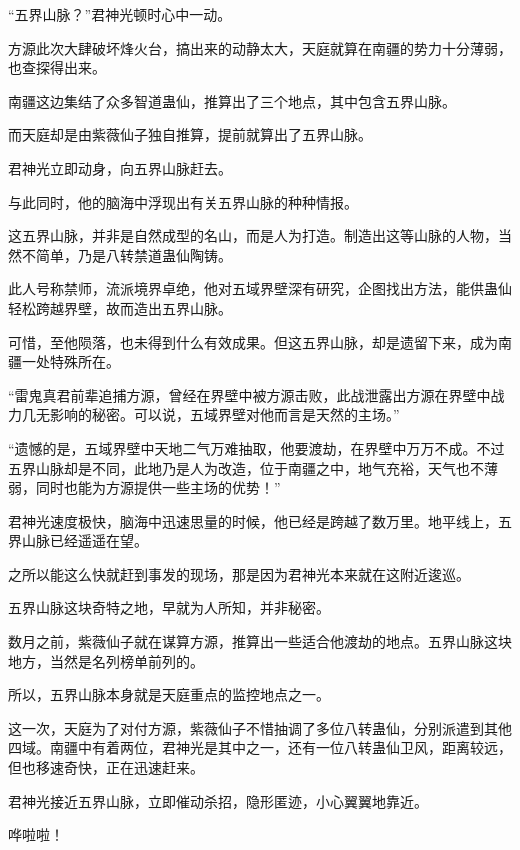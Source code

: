 
\begin{this_body}



“五界山脉？”君神光顿时心中一动。

方源此次大肆破坏烽火台，搞出来的动静太大，天庭就算在南疆的势力十分薄弱，也查探得出来。

南疆这边集结了众多智道蛊仙，推算出了三个地点，其中包含五界山脉。

而天庭却是由紫薇仙子独自推算，提前就算出了五界山脉。

君神光立即动身，向五界山脉赶去。

与此同时，他的脑海中浮现出有关五界山脉的种种情报。

这五界山脉，并非是自然成型的名山，而是人为打造。制造出这等山脉的人物，当然不简单，乃是八转禁道蛊仙陶铸。

此人号称禁师，流派境界卓绝，他对五域界壁深有研究，企图找出方法，能供蛊仙轻松跨越界壁，故而造出五界山脉。

可惜，至他陨落，也未得到什么有效成果。但这五界山脉，却是遗留下来，成为南疆一处特殊所在。

“雷鬼真君前辈追捕方源，曾经在界壁中被方源击败，此战泄露出方源在界壁中战力几无影响的秘密。可以说，五域界壁对他而言是天然的主场。”

“遗憾的是，五域界壁中天地二气万难抽取，他要渡劫，在界壁中万万不成。不过五界山脉却是不同，此地乃是人为改造，位于南疆之中，地气充裕，天气也不薄弱，同时也能为方源提供一些主场的优势！”

君神光速度极快，脑海中迅速思量的时候，他已经是跨越了数万里。地平线上，五界山脉已经遥遥在望。

之所以能这么快就赶到事发的现场，那是因为君神光本来就在这附近逡巡。

五界山脉这块奇特之地，早就为人所知，并非秘密。

数月之前，紫薇仙子就在谋算方源，推算出一些适合他渡劫的地点。五界山脉这块地方，当然是名列榜单前列的。

所以，五界山脉本身就是天庭重点的监控地点之一。

这一次，天庭为了对付方源，紫薇仙子不惜抽调了多位八转蛊仙，分别派遣到其他四域。南疆中有着两位，君神光是其中之一，还有一位八转蛊仙卫风，距离较远，但也移速奇快，正在迅速赶来。

君神光接近五界山脉，立即催动杀招，隐形匿迹，小心翼翼地靠近。

哗啦啦！


\end{this_body}
